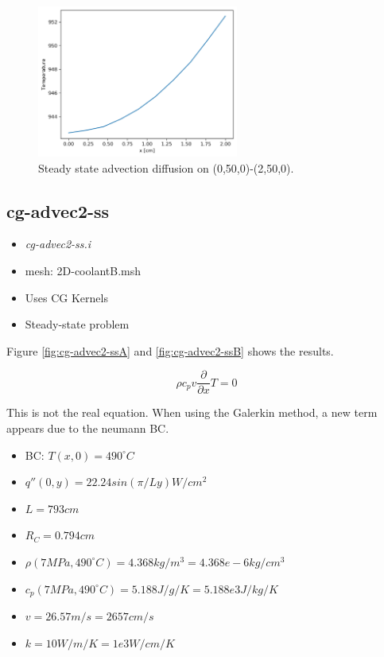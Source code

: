 \documentclass[11pt,letterpaper]{article}
\begin{document}
	\begin{figure}[htbp!]
		\centering
		\includegraphics[height=5cm]{cg-advec1-ssC}
		\caption{Steady state advection diffusion on (0,50,0)-(2,50,0).}
		\label{fig:cg-advec1-ssB}
	\end{figure}

	\subsection{cg-advec2-ss}

	\begin{itemize}
		\item \textit{cg-advec2-ss.i}
		\item mesh: 2D-coolantB.msh
		\item Uses CG Kernels
		\item Steady-state problem
	\end{itemize}

    Figure \ref{fig:cg-advec2-ssA} and \ref{fig:cg-advec2-ssB} shows the results.

	\begin{equation}
    \rho c_p v \frac{\partial}{\partial x} T = 0
	\end{equation}

	This is not the real equation. When using the Galerkin method, a new term appears due to the neumann BC.

	\begin{itemize}
		\item BC: $T(x, 0) = 490^{\circ}C$
		\item $q''(0, y) = 22.24 sin (\pi/L y) W/cm^2$
		\item $L = 793 cm$
		\item $R_C = 0.794 cm$
		\item $\rho (7 MPa, 490^{\circ}C) = 4.368 kg/m^3 = 4.368e-6 kg/cm^3$
		\item $c_p (7 MPa, 490^{\circ}C) = 5.188 J/g/K = 5.188e3 J/kg/K$
		\item $v = 26.57 m/s = 2657 cm/s$
		\item $k = 10 W/m/K = 1e3 W/cm/K$
	\end{itemize}
\end{document}
